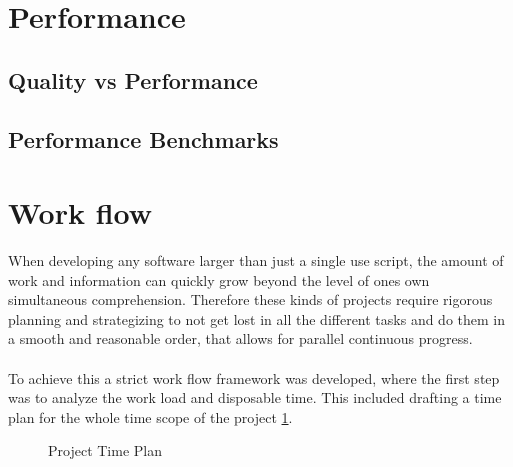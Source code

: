 \section{Performance}

\subsection{Quality vs Performance}

\subsection{Performance Benchmarks}


\section{Work flow}
When developing any software larger than just a single use script, the amount of work and information can quickly grow beyond the level of ones own simultaneous comprehension. Therefore these kinds of projects require rigorous planning and strategizing to not get lost in all the different tasks and do them in a smooth and reasonable order, that allows for parallel continuous progress.
\\\\
To achieve this a strict work flow framework was developed, where the first step was to analyze the work load and disposable time. This included drafting a time plan for the whole time scope of the project \ref{fig:time-plan}. 

\begin{figure}[H]
    \centering
    \caption{Project Time Plan}
    \label{fig:time-plan}
\end{figure}

